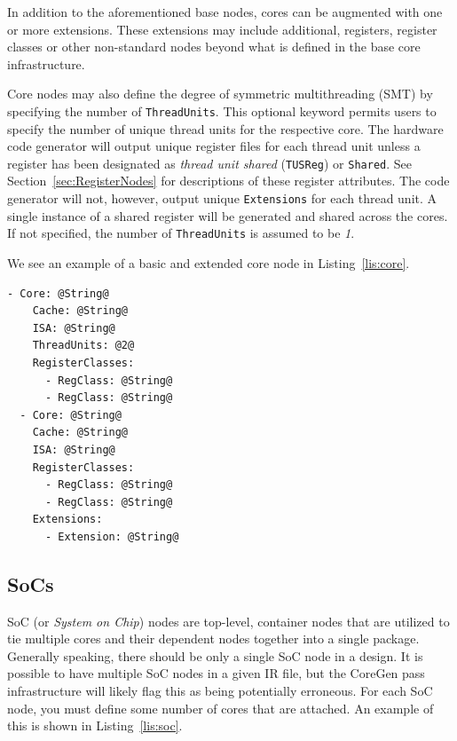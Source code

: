 \documentclass{article}
\begin{document}
In addition to the aforementioned base nodes, cores can be augmented with one or more extensions.  These extensions 
may include additional, registers, register classes or other non-standard nodes beyond what is defined in the base 
core infrastructure.

Core nodes may also define the degree of symmetric multithreading (SMT) by specifying the number of \texttt{ThreadUnits}.  
This optional keyword permits users to specify the number of unique thread units for the respective core.  The hardware 
code generator will output unique register files for each thread unit unless a register has been designated as 
\textit{thread unit shared} (\texttt{TUSReg}) or \texttt{Shared}.  See Section~\ref{sec:RegisterNodes} for descriptions 
of these register attributes.    
The code generator will not, however, output unique \texttt{Extensions} for each thread unit.  
A single instance of a shared register will be generated and shared across the cores.  If not specified, the number of 
\texttt{ThreadUnits} is assumed to be \textit{1}.  

We see an example of a basic and extended core node in Listing~\ref{lis:core}.   

\vspace{0.125in}
\begin{lstlisting}[frame=single,style=base,caption={Core Node Definition},captionpos=b,label={lis:core}]
- Core: @String@
    Cache: @String@
    ISA: @String@
    ThreadUnits: @2@
    RegisterClasses:
      - RegClass: @String@
      - RegClass: @String@
  - Core: @String@
    Cache: @String@
    ISA: @String@
    RegisterClasses:
      - RegClass: @String@
      - RegClass: @String@
    Extensions:
      - Extension: @String@
\end{lstlisting}

\clearpage
\subsection{SoCs}
\label{sec:SoCNodes}

SoC (or \textit{System on Chip}) nodes are top-level, container nodes that are utilized to tie multiple cores and their dependent 
nodes together into a single package.  Generally speaking, there should be only a single SoC node in a design.  It is possible to 
have multiple SoC nodes in a given IR file, but the CoreGen pass infrastructure will likely flag this as being potentially erroneous.  
For each SoC node, you must define some number of cores that are attached.  An example of this is shown in Listing~\ref{lis:soc}.  
\end{document}
